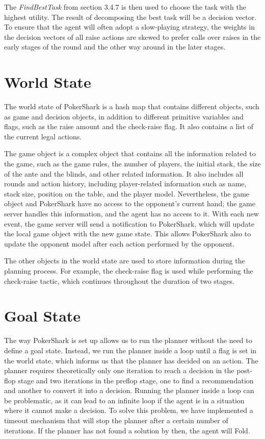 The \textit{FindBestTask} from section 3.4.7 is then used to choose the task with the highest utility. The result of decomposing the best task will be a decision vector. To ensure that the agent will often adopt a slow-playing strategy, the weights in the decision vectors of all raise actions are skewed to prefer calls over raises in the early stages of the round and the other way around in the later stages. 


\section{World State}
The world state of PokerShark is a hash map that contains different objects, such as game and decision objects, in addition to different primitive variables and flags, such as the raise amount and the check-raise flag. It also contains a list of the current legal actions.

The game object is a complex object that contains all the information related to the game, such as the game rules, the number of players, the initial stack, the size of the ante and the blinds, and other related information. It also includes all rounds and action history, including player-related information such as name, stack size, position on the table, and the player model. Nevertheless, the game object and PokerShark have no access to the opponent's current hand; the game server handles this information, and the agent has no access to it.
With each new event, the game server will send a notification to PokerShark, which will update the local game object with the new game state. This allows PokerShark also to update the opponent model after each action performed by the opponent.

The other objects in the world state are used to store information during the planning process. For example, the check-raise flag is used while performing the check-raise tactic, which continues throughout the duration of two stages.


\section{Goal State}
The way PokerShark is set up allows us to run the planner without the need to define a goal state. Instead, we run the planner inside a loop until a flag is set in the world state, which informs us that the planner has decided on an action. The planner requires theoretically only one iteration to reach a decision in the post-flop stage and two iterations in the preflop stage, one to find a recommendation and another to convert it into a decision. Running the planner inside a loop can be problematic, as it can lead to an infinite loop if the agent is in a situation where it cannot make a decision. To solve this problem, we have implemented a timeout mechanism that will stop the planner after a certain number of iterations. If the planner has not found a solution by then, the agent will Fold. 